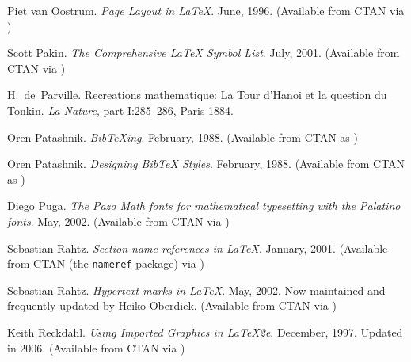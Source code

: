 \begin{thebibliography}{GMS94A}
  Piet van Oostrum.
  \newblock \emph{Page Layout in LaTeX}.
  \newblock June, 1996.
  \newblock (Available from CTAN via
            )

  Scott Pakin.
  \newblock \emph{The Comprehensive LaTeX Symbol List}.
  \newblock July, 2001.
  \newblock (Available from CTAN via
            )

  H.~de~Parville.
  \newblock Recreations mathematique: {La Tour d'Hanoi} et la question 
            du {Tonkin}.
  \newblock \emph{La Nature}, part {I}:285--286, Paris 1884.

  Oren Patashnik.
  \newblock \emph{BibTeXing}.
  \newblock February, 1988.
  \newblock (Available from CTAN as 
            )

  Oren Patashnik.
  \newblock \emph{Designing BibTeX Styles}.
  \newblock February, 1988.
  \newblock (Available from CTAN as 
            )

  Diego Puga.
  \newblock \emph{The Pazo Math fonts for mathematical typesetting
                  with the Palatino fonts}.
  \newblock May, 2002.
  \newblock (Available from CTAN via
            )

  Sebastian Rahtz.
  \newblock \emph{Section name references in LaTeX}.
  \newblock January, 2001. 
  \newblock (Available from CTAN (the \texttt{nameref} package) via 
            )

  Sebastian Rahtz.
  \newblock \emph{Hypertext marks in LaTeX}.
  \newblock May, 2002. Now maintained and frequently updated by Heiko Oberdiek.
  \newblock (Available from CTAN via 
            )

  Keith Reckdahl.
  \newblock \emph{Using Imported Graphics in LaTeX2e}.
  \newblock December, 1997. Updated in 2006.
  \newblock (Available from CTAN via
              )

\begin{comment}
\bibitem[Reh72]{REHE72}
  Rolf Rehe.
  \newblock `Type and how to make it most legible'.
  \newblock \emph{Design Research International}, 1972.
\end{comment}


\end{thebibliography}
